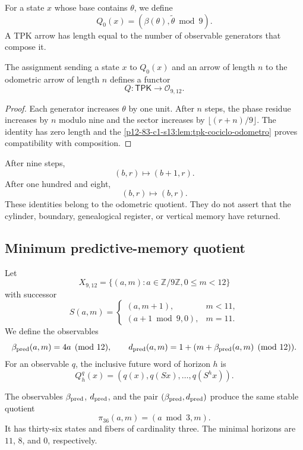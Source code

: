 For a state \(x\) whose base contains \(\theta\), we define
\[
 Q_0(x)=(\beta(\theta),\widetilde\theta\bmod9).
\]
A TPK arrow has length equal to the number of observable generators that
compose it.

\begin{theorem}
\label{p12-83-c1-s13:thm:tpk-funtor-fase-longitud}
The assignment sending a state \(x\) to \(Q_0(x)\) and an arrow of
length \(n\) to the odometric arrow of length \(n\) defines a functor
\[
 Q:\mathsf{TPK}\longrightarrow\mathcal O_{9,12}.
\]
\end{theorem}

\begin{proof}
Each generator increases \(\theta\) by one unit. After \(n\) steps, the
phase residue increases by \(n\) modulo nine and the sector increases by
\(\lfloor(r+n)/9\rfloor\). The identity has zero length and the
\cref{p12-83-c1-s13:lem:tpk-cociclo-odometro} proves compatibility with composition.
\end{proof}

After nine steps,
\[
 (b,r)\longmapsto(b+1,r).
\]
After one hundred and eight,
\[
 (b,r)\longmapsto(b,r).
\]
These identities belong to the odometric quotient. They do not assert that the
cylinder, boundary, genealogical register, or vertical memory have
returned.

\subsection{Minimum predictive-memory quotient}

Let
\[
 X_{9,12}=\{(a,m):a\in\mathbb Z/9\mathbb Z, 0\leq m<12\}
\]
with successor
\[
 S(a,m)=
 \begin{cases}
  (a,m+1),&m<11,\\
  (a+1\bmod9,0),&m=11.
 \end{cases}
\]
We define the observables
\[
 \beta_{\rm pred}(a,m)=4a\pmod{12},
 \qquad
 d_{\rm pred}(a,m)=1+(m+\beta_{\rm pred}(a,m)\pmod{12}).
\]
For an observable \(q\), the inclusive future word of horizon \(h\)
is
\[
 Q_h^q(x)=(q(x),q(Sx),\ldots,q(S^hx)).
\]

\begin{theorem}
\label{p12-83-c1-s13:thm:tpk-cociente-predictivo-36}
The observables \(\beta_{\rm pred}\), \(d_{\rm pred}\), and the pair
\((\beta_{\rm pred},d_{\rm pred})\) produce the same stable quotient
\[
 \pi_{36}(a,m)=(a\bmod3,m).
\]
It has thirty-six states and fibers of cardinality three. The minimal
horizons are \(11\), \(8\), and \(0\), respectively.
\end{theorem}

